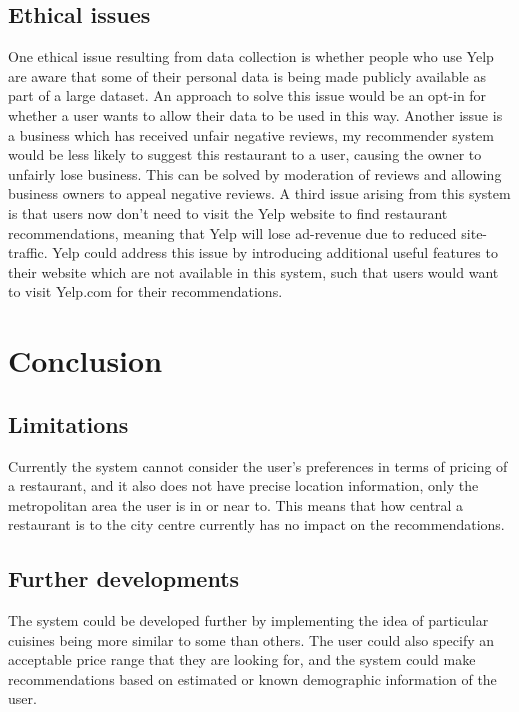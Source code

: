 \documentclass[conference]{IEEEtran}
\begin{document}
\subsection{Ethical issues}
One ethical issue resulting from data collection is whether people who use Yelp are aware that some of their 
personal data is being made publicly available as part of a large dataset. 
An approach to solve this issue would be an opt-in for whether a user wants to allow their data to be used in this way. 
Another issue is a business which has received unfair negative reviews, my recommender system would be less likely to 
suggest this restaurant to a user, causing the owner to unfairly lose business. 
This can be solved by moderation of reviews and allowing business owners to appeal negative reviews. 
A third issue arising from this system is that users now don't need to visit the Yelp website to find restaurant 
recommendations, meaning that Yelp will lose ad-revenue due to reduced site-traffic. 
Yelp could address this issue by introducing additional useful features to their website which are not available in 
this system, such that users would want to visit Yelp.com for their recommendations. 


\section{Conclusion}

\subsection{Limitations}
Currently the system cannot consider the user's preferences in terms of pricing of a restaurant, and it also does 
not have precise location information, only the metropolitan area the user is in or near to. 
This means that how central a restaurant is to the city centre currently has no impact on the recommendations. 

\subsection{Further developments}
The system could be developed further by implementing the idea of particular cuisines being more similar 
to some than others. 
The user could also specify an acceptable price range that they are looking for, and the system could make 
recommendations based on estimated or known demographic information of the user. 




\end{document}
